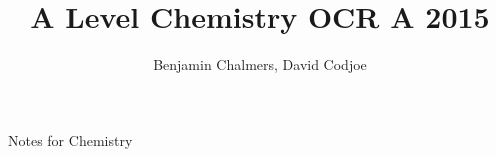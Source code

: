 \documentclass[11pt,a4paper]{memoir}
\author{Benjamin Chalmers, David Codjoe}
\title{A Level Chemistry OCR A 2015}
\begin{document}
\frontmatter
\maketitle
\newpage

Notes for Chemistry
	
\newpage
\tableofcontents
\mainmatter


	

	
%

%




\end{document}
